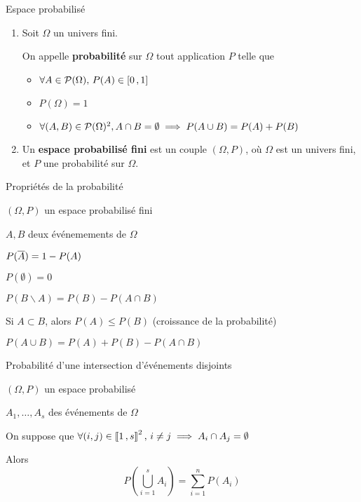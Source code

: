     \begin{defi}{Espace probabilisé}{}
        \begin{enumerate}
            \item Soit $\Omega$ un univers fini. 
    
            On appelle \textbf{probabilité} sur $\Omega$ tout application $P$ telle que
            \begin{itemize}
                \item $\forall A \in \mathcal{P}(\Omega), \, P(A) \in \left[ 0 \, , 1 \right]$
                \item $P(\Omega) = 1$
                \item $\forall (A,B) \in \mathcal{P}(\Omega)^2, \\ A \cap B = \emptyset \implies P(A \cup B) = P(A) + P(B)$
            \end{itemize}
            \item Un \textbf{espace probabilisé fini} est un couple $(\Omega,P)$, où $\Omega$ est un univers fini, et $P$ une probabilité sur $\Omega$.
        \end{enumerate}
    \end{defi}

    \begin{prop}{Propriétés de la probabilité}{}
        \begin{soient}
            \item $(\Omega,P)$ un espace probabilisé fini
            \item $A,B$ deux événemements de $\Omega$
        \end{soient}
        \begin{alors}
            \item $P(\overline{A}) = 1 - P(A)$
            \item $P(\emptyset) = 0$
            \item $P(B \backslash A) = P(B) - P(A \cap B)$
            \item Si $A \subset B$, alors $P(A) \leq P(B)$ (croissance de la probabilité)
            \item $P(A \cup B) = P(A) + P(B) - P(A \cap B)$
        \end{alors}
    \end{prop}

    \begin{prop}{Probabilité d’une intersection d’événements disjoints}{}
        \begin{soient}
            \item $(\Omega,P)$ un espace probabilisé
            \item $A_1, \ldots, A_s$ des événements de $\Omega$
        \end{soient}
        On suppose que $\forall (i,j) \in \left\llbracket 1 \, , s \right\rrbracket^2, \, i \neq j \implies A_i \cap A_j = \emptyset$

        Alors 
        \[ P\left(\bigcup\limits_{i=1}^s A_i\right) = \sum\limits_{i=1}^n P(A_i) \]
    \end{prop}

